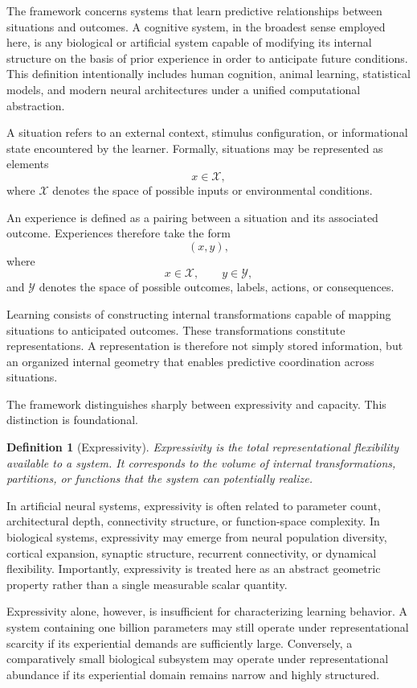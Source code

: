 \documentclass[12pt,a4paper]{article}
\newtheorem{definition}{Definition}[section]
\begin{document}
The framework concerns systems that learn predictive relationships between situations and outcomes. A cognitive system, in the broadest sense employed here, is any biological or artificial system capable of modifying its internal structure on the basis of prior experience in order to anticipate future conditions. This definition intentionally includes human cognition, animal learning, statistical models, and modern neural architectures under a unified computational abstraction.

A situation refers to an external context, stimulus configuration, or informational state encountered by the learner. Formally, situations may be represented as elements
\[
x \in \mathcal{X},
\]
where \(\mathcal{X}\) denotes the space of possible inputs or environmental conditions.

An experience is defined as a pairing between a situation and its associated outcome. Experiences therefore take the form
\[
(x,y),
\]
where
\[
x \in \mathcal{X}, \qquad y \in \mathcal{Y},
\]
and \(\mathcal{Y}\) denotes the space of possible outcomes, labels, actions, or consequences.

Learning consists of constructing internal transformations capable of mapping situations to anticipated outcomes. These transformations constitute representations. A representation is therefore not simply stored information, but an organized internal geometry that enables predictive coordination across situations.

The framework distinguishes sharply between expressivity and capacity. This distinction is foundational.

\begin{definition}[Expressivity]
Expressivity is the total representational flexibility available to a system. It corresponds to the volume of internal transformations, partitions, or functions that the system can potentially realize.
\end{definition}

In artificial neural systems, expressivity is often related to parameter count, architectural depth, connectivity structure, or function-space complexity. In biological systems, expressivity may emerge from neural population diversity, cortical expansion, synaptic structure, recurrent connectivity, or dynamical flexibility. Importantly, expressivity is treated here as an abstract geometric property rather than a single measurable scalar quantity.

Expressivity alone, however, is insufficient for characterizing learning behavior. A system containing one billion parameters may still operate under representational scarcity if its experiential demands are sufficiently large. Conversely, a comparatively small biological subsystem may operate under representational abundance if its experiential domain remains narrow and highly structured.
\end{document}
